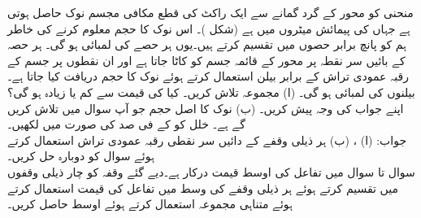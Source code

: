 
منحنی  کو  محور کے گرد گمانے سے ایک راکٹ کی قطع مکافی مجسم نوک حاصل ہوتی ہے جہاں  کی پیمائش میٹروں میں ہے (شکل )۔ اس نوک کا حجم معلوم کرنے کی خاطر ہم  کو پانچ  برابر حصوں میں تقسیم کرتے ہیں۔یوں ہر حصے کی لمبائی  ہو گی۔ ہر حصہ کے بائیں سر نقطہ پر  محور کے قائمہ جسم کو کاٹا جاتا ہے اور ان نقطوں پر جسم کے رقبہ عمودی تراش کے برابر بیلن استعمال کرتے ہوئے نوک کا حجم دریافت کیا جاتا ہے۔ بیلنوں کی لمبائی  ہو گی۔ (ا) مجموعہ  تلاش کریں۔ کیا  کی قیمت  سے کم یا زیادہ ہو گی؟ اپنے جواب کی وجہ پیش کریں۔ (ب) نوک کا اصل حجم جو آپ سوال  میں تلاش کریں گے   ہے۔ خلل  کو  کے فی صد کی صورت میں لکھیں۔ \\
جواب:\quad
(ا) ، (ب) 
ہر ذیلی وقفے کے دائیں سر نقطی رقبہ عمودی تراش استعمال کرتے ہوئے سوال  کو دوبارہ حل کریں۔
\\
سوال  تا سوال  میں تفاعل  کی اوسط قیمت درکار ہے۔دیے گئے وقفہ کو چار ذیلی وقفوں میں تقسیم کرتے ہوئے ہر ذیلی وقفے کی وسط میں تفاعل کی قیمت استعمال کرتے ہوئے متناہی مجموعہ استعمال کرتے ہوئے اوسط حاصل کریں۔


